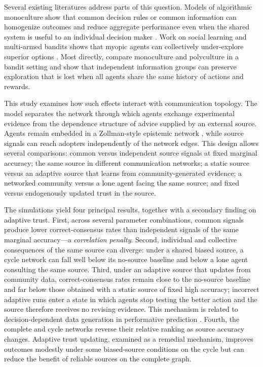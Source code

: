 \documentclass[10pt,letterpaper,twocolumn]{article}
\begin{document}
Several existing literatures address parts of this question. Models of algorithmic monoculture show that common decision rules or common information can homogenize outcomes and reduce aggregate performance even when the shared system is useful to an individual decision maker \citep{kleinberg2021,bommasani2022}. Work on social learning and multi-armed bandits shows that myopic agents can collectively under-explore superior options \citep{banihashem2023}. Most directly, \citet{heddenraghavan2026} compare monoculture and polyculture in a bandit setting and show that independent information groups can preserve exploration that is lost when all agents share the same history of actions and rewards.

This study examines how such effects interact with communication topology. The model separates the network through which agents exchange experimental evidence from the dependence structure of advice supplied by an external source. Agents remain embedded in a Zollman-style epistemic network \citep{zollman2007,zollman2010}, while source signals can reach adopters independently of the network edges. This design allows several comparisons: common versus independent source signals at fixed marginal accuracy; the same source in different communication networks; a static source versus an adaptive source that learns from community-generated evidence; a networked community versus a lone agent facing the same source; and fixed versus endogenously updated trust in the source.

The simulations yield four principal results, together with a secondary finding on adaptive trust. First, across several parameter combinations, common signals produce lower correct-consensus rates than independent signals of the same marginal accuracy---a \emph{correlation penalty}. Second, individual and collective consequences of the same source can diverge: under a shared biased source, a cycle network can fall well below its no-source baseline and below a lone agent consulting the same source. Third, under an adaptive source that updates from community data, correct-consensus rates remain close to the no-source baseline and far below those obtained with a static source of fixed high accuracy; incorrect adaptive runs enter a state in which agents stop testing the better action and the source therefore receives no revising evidence. This mechanism is related to decision-dependent data generation in performative prediction \citep{perdomo2020}. Fourth, the complete and cycle networks reverse their relative ranking as source accuracy changes. Adaptive trust updating, examined as a remedial mechanism, improves outcomes modestly under some biased-source conditions on the cycle but can reduce the benefit of reliable sources on the complete graph.
\end{document}
